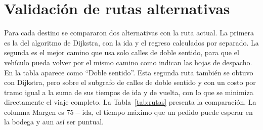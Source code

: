 \documentclass[11pt,letterpaper]{article}
\begin{document}
\section{Validación de rutas alternativas}

Para cada destino se compararon dos alternativas con la ruta actual. La primera es la del algoritmo de Dijkstra, con la ida y el regreso calculados por separado. La segunda es el mejor camino que usa solo calles de doble sentido, para que el vehículo pueda volver por el mismo camino como indican las hojas de despacho. En la tabla aparece como ``Doble sentido''. Esta segunda ruta también se obtuvo con Dijkstra, pero sobre el subgrafo de calles de doble sentido y con un costo por tramo igual a la suma de sus tiempos de ida y de vuelta, con lo que se minimiza directamente el viaje completo. La Tabla~\ref{tab:rutas} presenta la comparación. La columna Margen es $75-\text{ida}$, el tiempo máximo que un pedido puede esperar en la bodega y aun así ser puntual.
\end{document}
